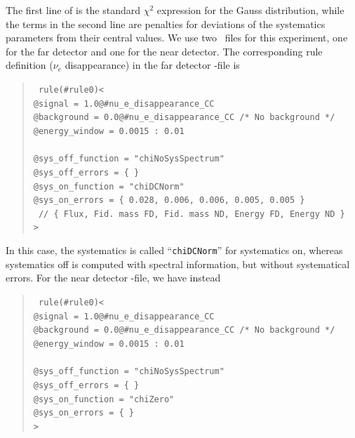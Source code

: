 %
The first line of  is the standard $\chi^2$ expression for
the Gauss distribution, while the terms in the second line are penalties
for deviations of the systematics parameters from their central values. 
%
We use two \AEDL\ files for this experiment, one for the far detector and one for the
near detector.
The corresponding rule definition ($\nu_e$ disappearance) in the far detector \AEDL -file is
\begin{quote}
{\tt
rule(\#rule0)< \\
\hspace*{0.5cm}        @signal     = 1.0@\#nu\_e\_disappearance\_CC \\
\hspace*{0.5cm}        @background = 0.0@\#nu\_e\_disappearance\_CC   /* No background */ \\
\hspace*{0.5cm} @energy\_window = 0.0015 : 0.01 \\
\\
\hspace*{0.5cm}        @sys\_off\_function = "chiNoSysSpectrum" \\
\hspace*{0.5cm}        @sys\_off\_errors   = \{ \} \\
\hspace*{0.5cm}        @sys\_on\_function  = "chiDCNorm" \\
\hspace*{0.5cm}        @sys\_on\_errors    = \{ 0.028,    0.006,        0.006,       0.005,     0.005   \} \\
\hspace*{0.5cm}        \mbox{ // \{ Flux, Fid. mass FD, Fid. mass ND, Energy FD, Energy ND \} } \\
> 
}
\end{quote}
In this case, the systematics is called ``{\tt chiDCNorm}'' for systematics on, whereas systematics
off is computed with spectral information, but without systematical errors.
For the near detector \AEDL -file, we have instead
\begin{quote}
{\tt
rule(\#rule0)< \\
\hspace*{0.5cm}        @signal     = 1.0@\#nu\_e\_disappearance\_CC \\
\hspace*{0.5cm}        @background = 0.0@\#nu\_e\_disappearance\_CC   /* No background */ \\
\hspace*{0.5cm} @energy\_window = 0.0015 : 0.01 \\
\\
\hspace*{0.5cm}        @sys\_off\_function = "chiNoSysSpectrum" \\
\hspace*{0.5cm}        @sys\_off\_errors   = \{ \} \\
\hspace*{0.5cm}        @sys\_on\_function  = "chiZero" \\
\hspace*{0.5cm}        @sys\_on\_errors    = \{ \} \\
> 
}
\end{quote}
